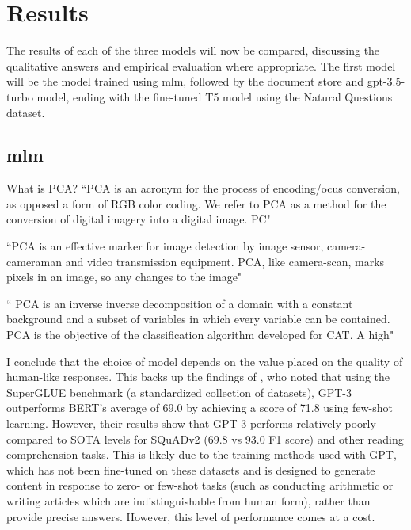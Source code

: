 \chapter{Results}
The results of each of the three models will now be compared, discussing the qualitative answers and empirical evaluation where appropriate. The first model will be the model trained using \acrfull{mlm}, followed by the document store and gpt-3.5-turbo model, ending with the fine-tuned T5 model using the Natural Questions dataset.

\section{\acrshort{mlm}}
What is PCA?
``PCA is an acronym for the process of encoding/ocus conversion, as opposed a form of RGB color coding. We refer to PCA as a method for the conversion of digital imagery into a digital image. PC"

``PCA is an effective marker for image detection by image sensor, camera-cameraman and video transmission equipment.
PCA, like camera-scan, marks pixels in an image, so any changes to the image"

``
PCA is an inverse inverse decomposition of a domain with a constant background and a subset of variables in which every variable can be contained.
PCA is the objective of the classification algorithm developed for CAT. A high"



I conclude that the choice of model depends on the value placed on the quality of human-like responses. This backs up the findings of \citet{brown2020}, who noted that using the SuperGLUE benchmark (a standardized collection of datasets), GPT-3 outperforms BERT's average of 69.0 by achieving a score of 71.8 using few-shot learning. However, their results show that GPT-3 performs relatively poorly compared to SOTA levels for SQuADv2 (69.8 vs 93.0 F1 score) and other reading comprehension tasks. This is likely due to the training methods used with GPT, which has not been fine-tuned on these datasets and is designed to generate content in response to zero- or few-shot tasks (such as conducting arithmetic or writing articles which are indistinguishable from human form), rather than provide precise answers. However, this level of performance comes at a cost.

